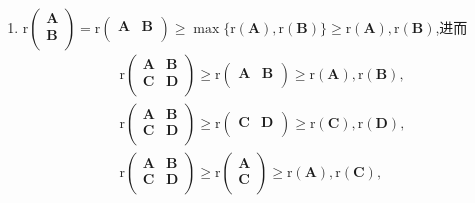 \documentclass[../../main.tex]{subfiles}%
\begin{document}
\begin{proposition}[矩阵秩的基本公式]
\begin{enumerate}[(1)]
\item \label{proposition:矩阵秩的基本公式-7} $\mathrm{r}\left( \begin{array}{c}
\boldsymbol{A}\\
\boldsymbol{B}\\
\end{array} \right) =\mathrm{r}\left( \begin{matrix}
\boldsymbol{A}&		\boldsymbol{B}\\
\end{matrix} \right)\geqslant\max\{\mathrm{r}\left( \boldsymbol{A} \right) ,\mathrm{r}\left( \boldsymbol{B} \right)\} \geqslant \mathrm{r}\left( \boldsymbol{A} \right) ,\mathrm{r}\left( \boldsymbol{B} \right)$,进而
\begin{gather*}
\mathrm{r}\left( \begin{matrix}
\boldsymbol{A}&		\boldsymbol{B}\\
\boldsymbol{C}&		\boldsymbol{D}\\
\end{matrix} \right) \geqslant \mathrm{r}\left( \begin{matrix}
\boldsymbol{A}&		\boldsymbol{B}\\
\end{matrix} \right) \geqslant \mathrm{r}\left( \boldsymbol{A} \right) ,\mathrm{r}\left( \boldsymbol{B} \right) ,
\\
\mathrm{r}\left( \begin{matrix}
\boldsymbol{A}&		\boldsymbol{B}\\
\boldsymbol{C}&		\boldsymbol{D}\\
\end{matrix} \right) \geqslant \mathrm{r}\left( \begin{matrix}
\boldsymbol{C}&		\boldsymbol{D}\\
\end{matrix} \right) \geqslant \mathrm{r}\left( \boldsymbol{C} \right) ,\mathrm{r}\left( \boldsymbol{D} \right) ,
\\
\mathrm{r}\left( \begin{matrix}
\boldsymbol{A}&		\boldsymbol{B}\\
\boldsymbol{C}&		\boldsymbol{D}\\
\end{matrix} \right) \geqslant \mathrm{r}\left( \begin{array}{c}
\boldsymbol{A}\\
\boldsymbol{C}\\
\end{array} \right) \geqslant \mathrm{r}\left( \boldsymbol{A} \right) ,\mathrm{r}\left( \boldsymbol{C} \right) ,

\end{gather*}
\end{enumerate}
\end{proposition}
\end{document}
